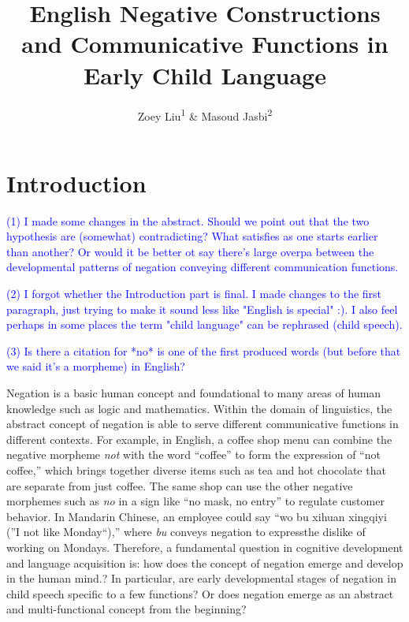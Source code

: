 \documentclass[
  english,
  man,floatsintext]{apa6}
\title{English Negative Constructions and Communicative Functions in Early Child Language}
\author{Zoey Liu\textsuperscript{1} \& Masoud Jasbi\textsuperscript{2}}
\date{}
\affiliation{\vspace{0.5cm}\textsuperscript{1} Boston College\\\textsuperscript{2} UC Davis}
\begin{document}
\maketitle

\hypertarget{introduction}{%
\section{Introduction}\label{introduction}}

\textcolor{blue}{(1) I made some changes in the abstract. Should we point out that the two hypothesis are (somewhat) contradicting? What satisfies as one starts earlier than another? Or would it be better ot say there's large overpa between the developmental patterns of negation conveying different communication functions.}

\textcolor{blue}{(2) I forgot whether the Introduction part is final. I made changes to the first paragraph, just trying to make it sound less like "English is special" :). I also feel perhaps in some places the term "child language" can be rephrased (child speech).}

\textcolor{blue}{(3) Is there a citation for *no* is one of the first produced words (but before that we said it's a morpheme) in English?}

Negation is a basic human concept and foundational to many areas of human knowledge such as logic and mathematics. Within the domain of linguistics, the abstract concept of negation is able to serve different communicative functions in different contexts. For example, in English, a coffee shop menu can combine the negative morpheme \emph{not} with the word ``coffee'' to form the expression of ``not coffee,'' which brings together diverse items such as tea and hot chocolate that are separate from just coffee. The same shop can use the other negative morphemes such as \emph{no} in a sign like ``no mask, no entry'' to regulate customer behavior. In Mandarin Chinese, an employee could say ``wo bu xihuan xingqiyi (''I not like Monday``),'' where \emph{bu} conveys negation to expressthe dislike of working on Mondays. Therefore, a fundamental question in cognitive development and language acquisition is: how does the concept of negation emerge and develop in the human mind.? In particular, are early developmental stages of negation in child speech specific to a few functions? Or does negation emerge as an abstract and multi-functional concept from the beginning?
\end{document}
